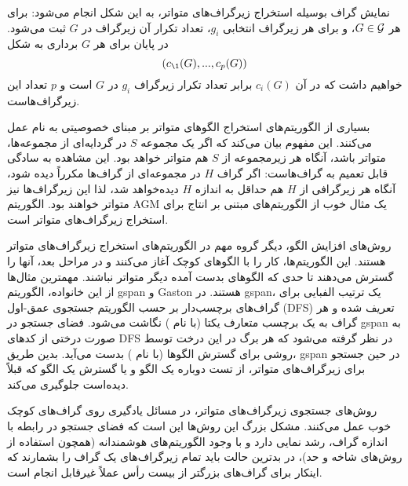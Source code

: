 نمایش گراف بوسیله استخراج زیرگراف‌های متواتر، به این شکل انجام می‌شود: برای هر $G \in \mathcal{G}$، و برای هر زیرگراف انتخابی $g_i$، تعداد تکرار آن زیرگراف در $G$ ثبت می‌شود. در پایان برای هر $G$ برداری به شکل
\begin{equation*}
(c_\1(G),...,c_p(G))
\end{equation*}
خواهیم داشت که در آن $c_i(G)$ برابر تعداد تکرار زیرگراف $g_i$ در $G$ است و $p$ تعداد این زیرگراف‌هاست.

بسیاری از الگوریتم‌های استخراج الگوهای متواتر بر مبنای خصوصیتی به نام  عمل می‌کنند. این مفهوم بیان می‌کند که اگر یک مجموعه $S$ در گردایه‌ای از مجموعه‌ها، متواتر باشد، آنگاه هر زیرمجموعه از $S$ هم متواتر خواهد بود. این مشاهده به سادگی قابل تعمیم به گراف‌هاست: اگر گراف $H$ در مجموعه‌ای از گراف‌ها مکرراً دیده شود، آنگاه هر زیرگرافی از $H$ هم حداقل به اندازه $H$ دیده‌خواهد شد، لذا این زیرگراف‌ها نیز متواتر خواهند بود. الگوریتم AGM  یک مثال خوب از الگوریتم‌های مبتنی بر انتاج برای استخراج زیرگراف‌های متواتر است.

روش‌های افزایش الگو، دیگر گروه مهم در الگوریتم‌های استخراج زیرگراف‌های متواتر هستند. این الگوریتم‌ها، کار را با الگوهای کوچک آغاز می‌کنند و در مراحل بعد، آنها را گسترش می‌دهند تا حدی که الگوهای بدست آمده دیگر متواتر نباشند. مهمترین مثال‌ها از این خانواده، الگوریتم gspan  و Gaston  هستند. در gspan، یک ترتیب الفبایی برای گراف‌های برچسب‌دار بر حسب الگوریتم جستجوی عمق-اول (DFS) تعریف شده و هر گراف به یک برچسب متعارف یکتا (با نام ) نگاشت می‌شود. فضای جستجو در gspan به صورت درختی از کدهای DFS در نظر گرفته می‌شود که هر برگ در این درخت توسط روشی برای گسترش الگوها (با نام ) بدست می‌آید. بدین طریق، gspan در حین جستجو برای زیرگراف‌های متواتر، از تست دوباره یک الگو و یا گسترش یک الگو که قبلاً دیده‌است جلوگیری می‌کند.

روش‌های جستجوی زیرگراف‌های متواتر، در مسائل یادگیری روی گراف‌های کوچک خوب عمل می‌کنند. مشکل بزرگ این روش‌ها این است که فضای جستجو در رابطه با اندازه گراف، رشد نمایی دارد و با وجود الگوریتم‌های هوشمندانه (همچون استفاده از روش‌های شاخه و حد)، در بدترین حالت باید تمام زیرگراف‌های یک گراف را بشمارند که اینکار برای گراف‌های بزرگتر از بیست رأس عملاً غیرقابل انجام است.


